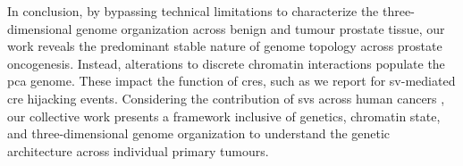In conclusion, by bypassing technical limitations to characterize the three-dimensional genome organization across benign and tumour prostate tissue, our work reveals the predominant stable nature of genome topology across prostate oncogenesis.
Instead, alterations to discrete chromatin interactions populate the \gls{pca} genome.
These impact the function of \glspl{cre}, such as we report for \gls{sv}-mediated \gls{cre} hijacking events.
Considering the contribution of \glspl{sv} across human cancers \cite{hanahanHallmarksCancerNext2011}, our collective work presents a framework inclusive of genetics, chromatin state, and three-dimensional genome organization to understand the genetic architecture across individual primary tumours.
